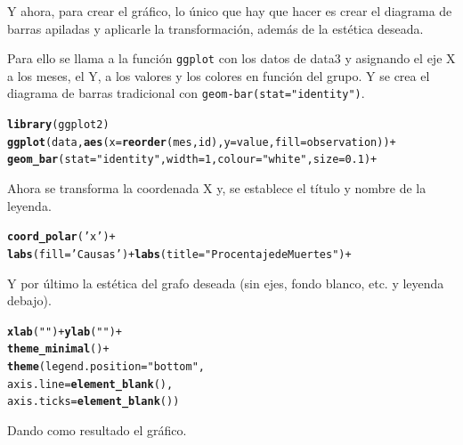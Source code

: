 \documentclass{article}\usepackage[]{graphicx}\usepackage[]{color}
\makeatletter
\newcommand{\hlstr}[1]{\textcolor[rgb]{0.192,0.494,0.8}{#1}}%
\newcommand{\hlopt}[1]{\textcolor[rgb]{0,0,0}{#1}}%
\newcommand{\hlstd}[1]{\textcolor[rgb]{0.345,0.345,0.345}{#1}}%
\newcommand{\hlkwc}[1]{\textcolor[rgb]{0.333,0.667,0.333}{#1}}%
\newcommand{\hlkwd}[1]{\textcolor[rgb]{0.737,0.353,0.396}{\textbf{#1}}}%
\newenvironment{kframe}{%
 \def\at@end@of@kframe{}%
 \ifinner\ifhmode%
  \def\at@end@of@kframe{\end{minipage}}%
  \begin{minipage}{\columnwidth}%
 \fi\fi%
 \def\FrameCommand##1{\hskip\@totalleftmargin \hskip-\fboxsep
 \colorbox{shadecolor}{##1}\hskip-\fboxsep
     \hskip-\linewidth \hskip-\@totalleftmargin \hskip\columnwidth}%
 \MakeFramed {\advance\hsize-\width
   \@totalleftmargin\z@ \linewidth\hsize
   \@setminipage}}%
 {\par\unskip\endMakeFramed%
 \at@end@of@kframe}
\newenvironment{knitrout}{}{} %
\makeatother
\begin{document}
Y ahora, para crear el gr\'afico, lo \'unico que hay que hacer es crear el diagrama de barras apiladas y aplicarle la transformaci\'on, adem\'as de la est\'etica deseada.

Para ello se llama a la funci\'on \texttt{ggplot} con los datos de data3 y asignando el eje X a los meses, el Y, a los valores y los colores en funci\'on del grupo. Y se crea el diagrama de barras tradicional con \texttt{geom-bar(stat="identity")}.
\begin{knitrout}
\color{fgcolor}\begin{kframe}
\begin{alltt}
\hlkwd{library}(ggplot2)
\hlkwd{ggplot}(data,\hlkwd{aes}(x=\hlkwd{reorder}(mes, id),y=value,fill=observation))+
  \hlkwd{geom_bar}(stat=\hlstr{"identity"},width=1,colour=\hlstr{"white"},size=0.1)+
\end{alltt}
\end{kframe}
\end{knitrout}
Ahora se transforma la coordenada X y, se establece el t\'itulo y nombre de la leyenda.
\begin{knitrout}
\color{fgcolor}\begin{kframe}
\begin{alltt}
  \hlkwd{coord_polar}(\hlstr{'x'})+
  \hlkwd{labs}(fill=\hlstr{'Causas'}) + \hlkwd{labs}(title = \hlstr{"Procentaje de Muertes"}) +
\end{alltt}
\end{kframe}
\end{knitrout}
Y por \'ultimo la est\'etica del grafo deseada (sin ejes, fondo blanco, etc. y leyenda debajo).
\begin{knitrout}
\color{fgcolor}\begin{kframe}
\begin{alltt}
  \hlkwd{xlab}\hlstd{(}\hlstr{""}\hlstd{)}\hlopt{+}\hlkwd{ylab}\hlstd{(}\hlstr{""}\hlstd{)} \hlopt{+}
  \hlkwd{theme_minimal}\hlstd{()} \hlopt{+}
  \hlkwd{theme}\hlstd{(}\hlkwc{legend.position} \hlstd{=} \hlstr{"bottom"}\hlstd{,}
        \hlkwc{axis.line} \hlstd{=} \hlkwd{element_blank}\hlstd{(),}
        \hlkwc{axis.ticks} \hlstd{=} \hlkwd{element_blank}\hlstd{())}
\end{alltt}
\end{kframe}
\end{knitrout}
\clearpage
Dando como resultado el gr\'afico.
\end{document}
